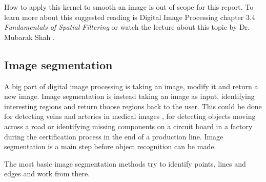 How to apply this kernel to smooth an image is out of scope for this report.
To learn more about this suggested reading is Digital Image Processing chapter 3.4
{\em Fundamentals of Spatial Filtering} \cite{gonzalez2008} or
watch the lecture about this topic by Dr. Mubarak Shah \cite{youtube:lectureFiltering}.


\subsection{Image segmentation}
A big part of digital image processing is taking an image, modify it and
return a new image. Image segmentation is instead taking an image as input,
identifying interesting regions and return thoose regions back to the user.
This could be done for detecting veins and arteries in medical images \cite{olena2010},
for detecting objects moving across a road or identifying missing components on
a circuit board in a factory during the certification process in the end of a production line.
Image segmentation is a main step before object recognition can be made.

The most basic image segmentation methods try to identify points, lines and edges
and work from there.

